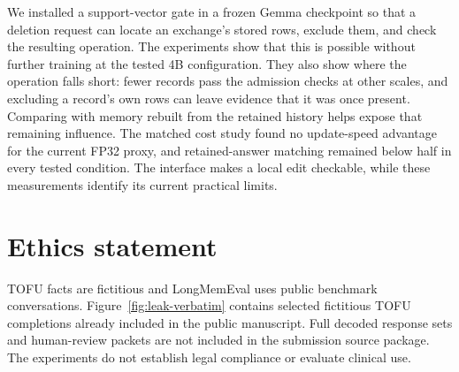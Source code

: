 We installed a support-vector gate in a frozen Gemma checkpoint so that a
deletion request can locate an exchange's stored rows, exclude them, and
check the resulting operation. The experiments show that this is possible
without further training at the tested 4B configuration. They also show
where the operation falls short: fewer records pass the admission checks at
other scales, and excluding a record's own rows can leave evidence that it
was once present. Comparing with memory rebuilt from the retained history
helps expose that remaining influence. The matched cost study found no
update-speed advantage for the current FP32 proxy, and retained-answer matching
remained below half in every tested condition. The interface makes a local
edit checkable, while these measurements identify its current practical limits.

\FloatBarrier
\label{main-text-end}

\section*{Ethics statement}
TOFU facts are fictitious and LongMemEval uses public benchmark conversations.
Figure~\ref{fig:leak-verbatim} contains selected fictitious TOFU completions
already included in the public manuscript. Full decoded response sets and
human-review packets are not included in the submission source package.
The experiments do not establish legal compliance or evaluate clinical use.


